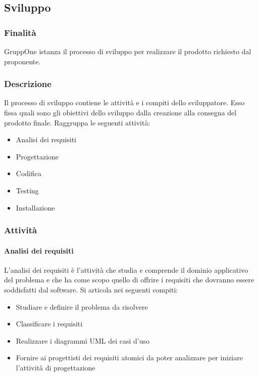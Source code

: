 \documentclass[../norme-di-progetto.tex]{subfiles}
\begin{document}
\subsection{Sviluppo}%
\label{sub:sviluppo}

\subsubsection{Finalità}%
\label{subs:sviluppo/finalita}

GruppOne istanza il processo di sviluppo per realizzare il prodotto richiesto dal proponente.

\subsubsection{Descrizione}%
\label{subs:sviluppo/descrizione}

Il processo di sviluppo contiene le attività e i compiti dello sviluppatore. Esso fissa quali sono gli obiettivi dello sviluppo dalla creazione alla consegna del prodotto finale. Raggruppa le seguenti attività:

\begin{itemize}
  \item Analisi dei requisiti
  \item Progettazione
  \item Codifica
  \item Testing
  \item Installazione
\end{itemize}

\subsubsection{Attività}%
\label{subs:sviluppo/attivita}

\paragraph{Analisi dei requisiti}%
\label{par:analisi_dei_requisiti}
L'analisi dei requisiti è l'attività che studia e comprende il dominio applicativo del problema e che ha come scopo quello di offrire i requisiti che dovranno essere soddisfatti dal software. Si articola nei seguenti compiti:

\begin{itemize}
  \item Studiare e definire il problema da risolvere
  \item Classificare i requisiti
  \item Realizzare i diagrammi UML dei casi d'uso
  \item Fornire ai progettisti dei requisiti atomici da poter analizzare per iniziare l'attività di progettazione
\end{itemize}
\end{document}
